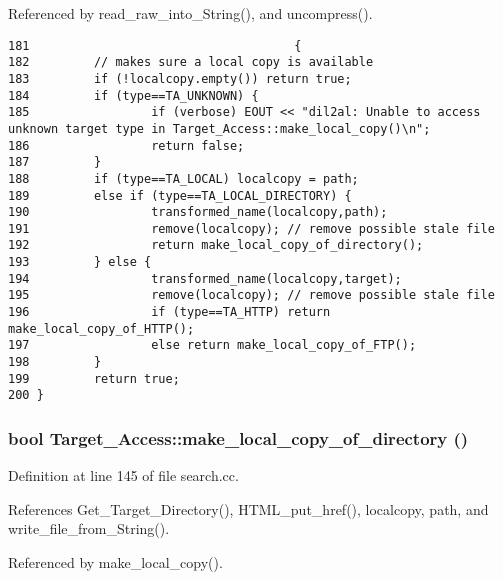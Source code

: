 Referenced by read\_\-raw\_\-into\_\-String(), and uncompress().



\footnotesize\begin{verbatim}181                                     {
182         // makes sure a local copy is available
183         if (!localcopy.empty()) return true;
184         if (type==TA_UNKNOWN) {
185                 if (verbose) EOUT << "dil2al: Unable to access unknown target type in Target_Access::make_local_copy()\n";
186                 return false;
187         }
188         if (type==TA_LOCAL) localcopy = path;
189         else if (type==TA_LOCAL_DIRECTORY) {
190                 transformed_name(localcopy,path);
191                 remove(localcopy); // remove possible stale file
192                 return make_local_copy_of_directory();
193         } else {
194                 transformed_name(localcopy,target);
195                 remove(localcopy); // remove possible stale file
196                 if (type==TA_HTTP) return make_local_copy_of_HTTP();
197                 else return make_local_copy_of_FTP();
198         }
199         return true;
200 }
\end{verbatim}\normalsize 
{}
\subsubsection{\setlength{\rightskip}{0pt plus 5cm}bool Target\_\-Access::make\_\-local\_\-copy\_\-of\_\-directory ()\hspace{0.3cm}{\tt  [protected]}}\label{classTarget__Access_b5}




Definition at line 145 of file search.cc.

References Get\_\-Target\_\-Directory(), HTML\_\-put\_\-href(), localcopy, path, and write\_\-file\_\-from\_\-String().

Referenced by make\_\-local\_\-copy().



